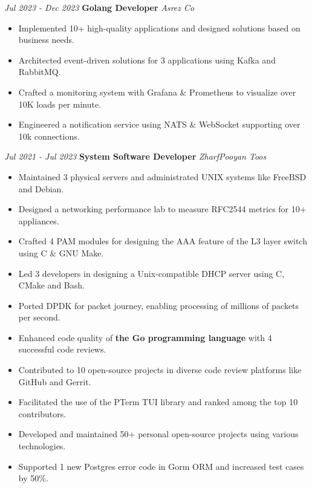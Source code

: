 \documentclass{engineercv}
\begin{document}
\begin{twocolentry}{\textit{Jul 2023 - Dec 2023}}
  \textbf{Golang Developer}
  \textit{Asrez Co}
\end{twocolentry}

\begin{itemize}
  \item Implemented 10+ high-quality applications and designed solutions based on business needs.
  \item Architected event-driven solutions for 3 applications using Kafka and RabbitMQ.
  \item Crafted a monitoring system with Grafana \& Prometheus to visualize over 10K loads per minute.
  \item Engineered a notification service using NATS \& WebSocket supporting over 10k connections.
\end{itemize}

\begin{twocolentry}{\textit{Jul 2021 - Jul 2023}}
  \textbf{System Software Developer}
  \textit{ZharfPooyan Toos}
\end{twocolentry}

\begin{itemize}
  \item Maintained 3 physical servers and administrated UNIX systems like FreeBSD and Debian.
  \item Designed a networking performance lab to measure RFC2544 metrics for 10+ appliances.
  \item Crafted 4 PAM modules for designing the AAA feature of the L3 layer switch using C \& GNU Make.
  \item Led 3 developers in designing a Unix-compatible DHCP server using C, CMake and Bash.
  \item Ported DPDK for packet journey, enabling processing of millions of packets per second.
\end{itemize}

\begin{itemize}
  \item Enhanced code quality of \textbf{the Go programming language} with 4 successful code reviews.
  \item Contributed to 10 open-source projects in diverse code review platforms like GitHub and Gerrit.
  \item Facilitated the use of the PTerm TUI library and ranked among the top 10 contributors.
  \item Developed and maintained 50+ personal open-source projects using various technologies.
  \item Supported 1 new Postgres error code in Gorm ORM and increased test cases by 50\%.
\end{itemize}
\end{document}
